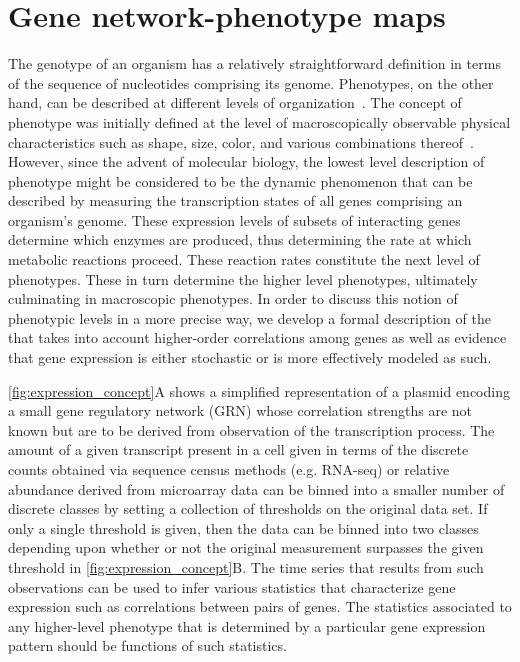 
\section{Gene network-phenotype maps}\label{sec:genenetworkphenmap}
The genotype of an organism has a relatively straightforward definition in terms of the sequence of nucleotides comprising its genome. Phenotypes, on the other hand, can be described at different levels of organization~\cite{Dawkins1982,Stadler2001}. The concept of phenotype was initially defined at the level of macroscopically observable physical characteristics such as shape, size, color, and various combinations thereof~\cite{Johannsen1911}. However, since the advent of molecular biology, the lowest level description of phenotype might be considered to be the dynamic phenomenon that can be described by measuring the transcription states of all genes comprising an organism's genome.  These expression levels of subsets of interacting genes determine which enzymes are produced, thus determining the rate at which metabolic reactions proceed.  These reaction rates constitute the next level of phenotypes.  These in turn determine the higher level phenotypes, ultimately culminating in macroscopic phenotypes.  In order to discuss this notion of phenotypic levels in a more precise way, we develop a formal description of the \gnpm{} that takes into account higher-order correlations among genes as well as evidence that gene expression is either stochastic or is more effectively modeled as such.

\ref{fig:expression_concept}A shows a simplified representation of a plasmid encoding a small gene regulatory network (GRN) whose correlation strengths are not known but are to be derived from observation of the transcription process. The amount of a given transcript present in a cell given in terms of the discrete counts obtained via sequence census methods (e.g. RNA-seq) or relative abundance derived from microarray data can be binned into a smaller number of discrete classes by setting a collection of thresholds on the original data set. If only a single threshold is given, then the data can be binned into two classes depending upon whether or not the original measurement surpasses the given threshold in \ref{fig:expression_concept}B.
The time series that results from such observations can be used to infer various statistics that characterize gene expression such as correlations between pairs of genes. The statistics associated to any higher-level phenotype that is determined by a particular gene expression pattern should be functions of such statistics.

